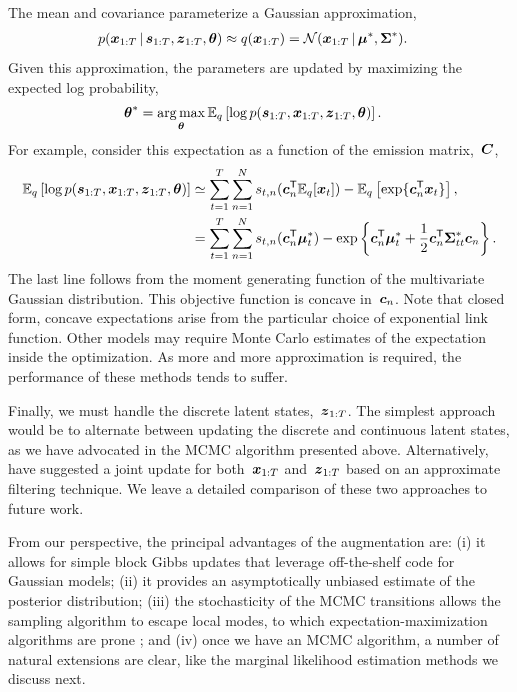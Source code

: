 The mean and covariance parameterize a Gaussian approximation,
\begin{align*}
  p(\boldsymbol{x}_{1:T} \,|\, \boldsymbol{s}_{1:T}, \boldsymbol{z}_{1:T}, \boldsymbol{\theta})
  &\approx
  q(\boldsymbol{x}_{1:T}) =
  \mathcal{N}(\boldsymbol{x}_{1:T} \,|\, \boldsymbol{\mu}^*, \boldsymbol{\Sigma}^*).
\end{align*}
Given this approximation, the parameters are updated by maximizing
the expected log probability,
\begin{align*}
  \btheta^*
  &=
  \argmax_{\btheta} \bbE_{q} \left[ \log p(\bs_{1:T}, \bx_{1:T}, \bz_{1:T}, \btheta) \right]. 
\end{align*}
For example, consider this expectation as a function of the emission
matrix,~$\boldsymbol{C}$,
\begin{align*}
  \mathbb{E}_q \left[ \log p(\boldsymbol{s}_{1:T}, \boldsymbol{x}_{1:T}, \boldsymbol{z}_{1:T}, \boldsymbol{\theta}) \right]
  &\simeq
  \sum_{t=1}^T \sum_{n=1}^N s_{t,n} (\boldsymbol{c}_{n}^{\mathsf{T}} \mathbb{E}_q[\boldsymbol{x}_{t}]) - \mathbb{E}_q\left[\exp\{\boldsymbol{c}_n^{\mathsf{T}} \boldsymbol{x}_{t}\} \right], \\
  &=
  \sum_{t=1}^T \sum_{n=1}^N s_{t,n} (\boldsymbol{c}_{n}^{\mathsf{T}} \boldsymbol{\mu}_{t}^*)
  - \exp \left\{
  \boldsymbol{c}_n^{\mathsf{T}} \boldsymbol{\mu}_t^*  +\frac{1}{2} \boldsymbol{c}_n^{\mathsf{T}} \boldsymbol{\Sigma}_{tt}^* \boldsymbol{c}_n
  \right\}.
\end{align*}
The last line follows from the moment generating function of the
multivariate Gaussian distribution.  This objective function is
concave in~$\boldsymbol{c}_n$. Note that closed form, concave expectations
arise from the particular choice of exponential link function.
Other models may require Monte Carlo estimates of the expectation
inside the optimization. As more and more approximation is required,
the performance of these methods tends to suffer.

Finally, we must handle the discrete latent states,~$\boldsymbol{z}_{1:T}$.
The simplest approach would be to alternate between updating the
discrete and continuous latent states, as we have advocated in the
MCMC algorithm presented above. Alternatively, \citet{Petreska-2011}
have suggested a joint update for both~$\boldsymbol{x}_{1:T}$ and~$\boldsymbol{z}_{1:T}$
based on an approximate filtering technique. We leave a detailed
comparison of these two approaches to future work.

From our perspective, the principal advantages of the \polyagamma
augmentation are: (i) it allows for simple block Gibbs updates that
leverage off-the-shelf code for Gaussian models; (ii) it provides an
asymptotically unbiased estimate of the posterior distribution;
(iii) the stochasticity of the MCMC transitions allows the sampling
algorithm to escape local modes, to which expectation-maximization
algorithms are prone \citep{bishop2006pattern}; and (iv) once we
have an MCMC algorithm, a number of natural extensions are clear,
like the marginal likelihood estimation methods we discuss next.

